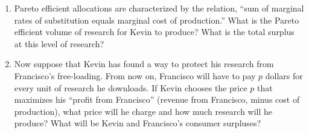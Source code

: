 \documentclass[11pt]{article}
\begin{document}
\begin{enumerate}





\item Pareto efficient allocations are characterized by the relation, ``sum of
marginal rates of substitution equals marginal cost of production.'' What is the
Pareto efficient volume of research for Kevin to produce? What is the total
surplus at this level of research?




\item Now suppose that Kevin has found a way to protect his research from
Francisco's free-loading. From now on, Francisco will have to pay $p$ dollars
for every unit of research he downloads. If Kevin chooses the price $p$ that
maximizes his ``profit from Francisco'' (revenue from Francisco, minus cost of
production), what price will he charge and how much research will he produce?
What will be Kevin and Francisco's consumer surpluses?


\end{enumerate}
\end{document}
